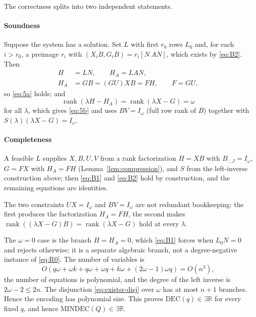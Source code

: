The correctness splits into two independent statements.

\paragraph*{Soundness}
Suppose the system has a solution. Set $L$ with first $r_0$ rows $L_0$ and, for each $i>r_0$, a preimage $r_i$ with $(X_iB,G_iB)=r_i[N\ AN]$, which exists by \eqref{eq:B2}. Then
\begin{equation*}
\begin{aligned}
H&=LN,\qquad H_A=LAN,\\
H_A&=GB=(GU)XB=FH,\qquad F=GU,
\end{aligned}
\end{equation*}
so \eqref{eq:5a} holds; and
\begin{equation*}
\operatorname{rank}(\lambda H-H_A)=\operatorname{rank}(\lambda X-G)=\omega
\end{equation*}
for all $\lambda$, which gives \eqref{eq:5b} and uses $BV=I_\omega$ (full row rank of $B$) together with $S(\lambda)(\lambda X-G)=I_\omega$.

\paragraph*{Completeness}
A feasible $L$ supplies $X,B,U,V$ from a rank factorization $H=XB$ with $B_{:,J}=I_\omega$, $G=FX$ with $H_A=FH$ (Lemma~\ref{lem:compression}), and $S$ from the left-inverse construction above; then \eqref{eq:B1} and \eqref{eq:B2} hold by construction, and the remaining equations are identities.

The two constraints $UX=I_\omega$ and $BV=I_\omega$ are not redundant bookkeeping: the first produces the factorization $H_A=FH$, the second makes $\operatorname{rank}((\lambda X-G)B)=\operatorname{rank}(\lambda X-G)$ hold at every $\lambda$.

The $\omega=0$ case is the branch $H=H_A=0$, which \eqref{eq:B1} forces when $L_0N=0$ and rejects otherwise; it is a separate algebraic branch, not a degree-negative instance of \eqref{eq:R0}. The number of variables is
\begin{equation}
O(q\omega+\omega k+q\omega+\omega q+k\omega+(2\omega-1)\omega q)
=O(n^3),
\end{equation}
the number of equations is polynomial, and the degree of the left inverse is $2\omega-2\le2n$. The disjunction \eqref{eq:existsr-disj} over $\omega$ has at most $n+1$ branches. Hence the encoding has polynomial size. This proves $\mathrm{DEC}(q)\in\exists\mathbb R$ for every fixed $q$, and hence $\mathrm{MINDEC}(Q)\in\exists\mathbb R$.

